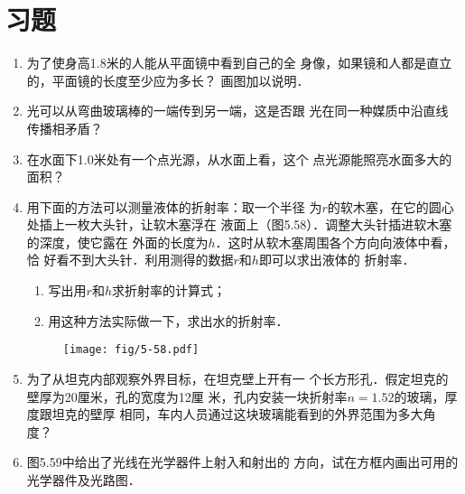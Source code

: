 \section*{习题}
\begin{enumerate}
    \item 为了使身高1.8米的人能从平面镜中看到自己的全
身像，如果镜和人都是直立的，平面镜的长度至少应为多长？
画图加以说明．
\item 光可以从弯曲玻璃棒的一端传到另一端，这是否跟
光在同一种媒质中沿直线传播相矛盾？
\item 在水面下1.0米处有一个点光源，从水面上看，这个
点光源能照亮水面多大的面积？
\item 用下面的方法可以测量液体的折射率：取一个半径
为$r$的软木塞，在它的圆心处插上一枚大头针，让软木塞浮在
液面上（图5.58）．调整大头针插进软木塞的深度，使它露在
外面的长度为$h$．这时从软木塞周围各个方向向液体中看，恰
好看不到大头针．利用测得的数据$r$和$h$即可以求出液体的
折射率．
\begin{enumerate}
    \item 写出用$r$和$h$求折射率的计算式；
    \item 用这种方法实际做一下，求出水的折射率．
\end{enumerate}
\begin{figure}[htp]\centering
    \texttt{[image: fig/5-58.pdf]}
    \caption{}
    \end{figure}
\item 为了从坦克内部观察外界目标，在坦克壁上开有一
个长方形孔．假定坦克的壁厚为20厘米，孔的宽度为12厘
米，孔内安装一块折射率$n=1.52$的玻璃，厚度跟坦克的壁厚
相同，车内人员通过这块玻璃能看到的外界范围为多大角度？
\item 图5.59中给出了光线在光学器件上射入和射出的
方向，试在方框内画出可用的光学器件及光路图．
\begin{figure}[htp]
	\centering
{}
\end{figure}
\end{enumerate}
